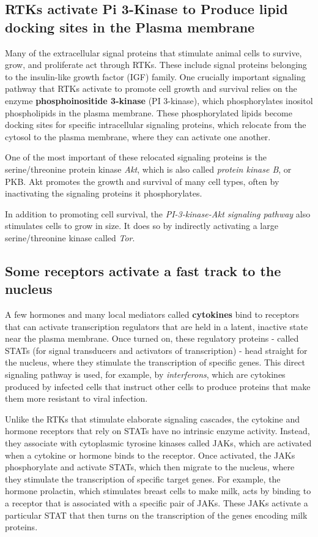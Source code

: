 \subsection{RTKs activate Pi 3-Kinase to Produce lipid docking sites in the Plasma membrane}

Many of the extracellular signal proteins that stimulate animal cells to
survive, grow, and proliferate act through RTKs. These include signal
proteins belonging to the insulin-like growth factor (IGF) family. One
crucially important signaling pathway that RTKs activate to promote cell
growth and survival relies on the enzyme \textbf{phosphoinositide 3-kinase}
(PI 3-kinase), which phosphorylates inositol phospholipids in the plasma
membrane. These phosphorylated lipids become docking sites for specific 
intracellular signaling proteins, which relocate from the cytosol to
the plasma membrane, where they can activate one another.

One of the most important of these relocated signaling proteins is the
serine/threonine protein kinase \textit{Akt}, which is also called \textit{protein kinase B},
or PKB. Akt promotes the growth and survival of many cell
types, often by inactivating the signaling proteins it phosphorylates.

In addition to promoting cell survival, the \textit{PI-3-kinase-Akt signaling pathway} 
also stimulates cells to grow in size. It does so by indirectly activating
a large serine/threonine kinase called \textit{Tor}.

\subsection{Some receptors activate a fast track to the nucleus}

A few hormones and many local mediators called \textbf{cytokines} bind to
receptors that can activate transcription regulators that are held in a
latent, inactive state near the plasma membrane. Once turned on, these
regulatory proteins - called STATs (for signal transducers and activators
of transcription) - head straight for the nucleus, where they stimulate the
transcription of specific genes. This direct signaling pathway is used, for
example, by \textit{interferons}, which are cytokines produced by infected cells
that instruct other cells to produce proteins that make them more resistant 
to viral infection.

Unlike the RTKs that stimulate elaborate signaling cascades, the cytokine
and hormone receptors that rely on STATs have no intrinsic enzyme activity. 
Instead, they associate with cytoplasmic tyrosine kinases called JAKs,
which are activated when a cytokine or hormone binds to the receptor.
Once activated, the JAKs phosphorylate and activate STATs, which then
migrate to the nucleus, where they stimulate the transcription of specific 
target genes. For example, the hormone prolactin, which stimulates
breast cells to make milk, acts by binding to a receptor that is associated 
with a specific pair of JAKs. These JAKs activate a particular STAT
that then turns on the transcription of the genes encoding milk proteins.

